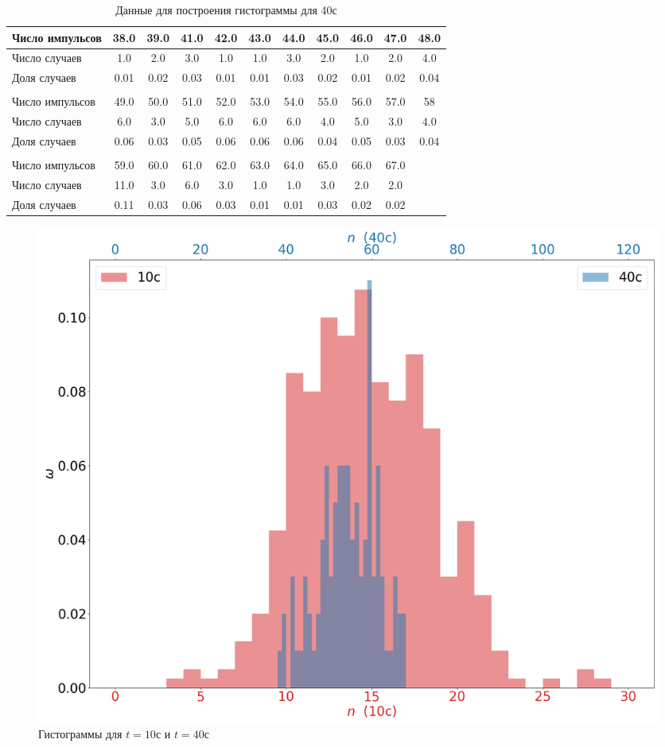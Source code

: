 \documentclass[a4paper, 12pt]{article}
\begin{document}
    \begin{table}[H]
    \begin{center}
    \begin{tabular}{|l|c|c|c|c|c|c|c|c|c|c|}\hline
    Число импульсов & 38.0 & 39.0 & 41.0 & 42.0 & 43.0 & 44.0 & 45.0 & 46.0 & 47.0 & 48.0 \\\hline
    Число случаев & 1.0 & 2.0 & 3.0 & 1.0 & 1.0 & 3.0 & 2.0 & 1.0 & 2.0 & 4.0 \\\hline
    Доля случаев & 0.01 & 0.02 & 0.03 & 0.01 & 0.01 & 0.03 & 0.02 & 0.01 & 0.02 & 0.04 \\\hline
    \multicolumn{11}{c}{}\\\hline
    Число импульсов & 49.0 & 50.0 & 51.0 & 52.0 & 53.0 & 54.0 & 55.0 & 56.0 & 57.0 & 58\\\hline
    Число случаев & 6.0 & 3.0 & 5.0 & 6.0 & 6.0 & 6.0 & 4.0 & 5.0 & 3.0 & 4.0 \\\hline
    Доля случаев & 0.06 & 0.03 & 0.05 & 0.06 & 0.06 & 0.06 & 0.04 & 0.05 & 0.03 & 0.04 \\\hline
    \multicolumn{10}{c}{}\\\hline
    Число импульсов & 59.0 & 60.0 & 61.0 & 62.0 & 63.0 & 64.0 & 65.0 & 66.0 & 67.0  \\\hline
    Число случаев & 11.0 & 3.0 & 6.0 & 3.0 & 1.0 & 1.0 & 3.0 & 2.0 & 2.0  \\\hline
    Доля случаев & 0.11 & 0.03 & 0.06 & 0.03 & 0.01 & 0.01 & 0.03 & 0.02 & 0.02  \\\hline
    \end{tabular}
    \caption{Данные для построения гистограммы для 40с}
    \end{center}
    \end{table}
    \newpage

    \begin{figure}
        \includegraphics[scale=0.45]{histogram.png}
        \caption{Гистограммы для $t=10с$ и $t=40с$}
    \end{figure}
\end{document}
